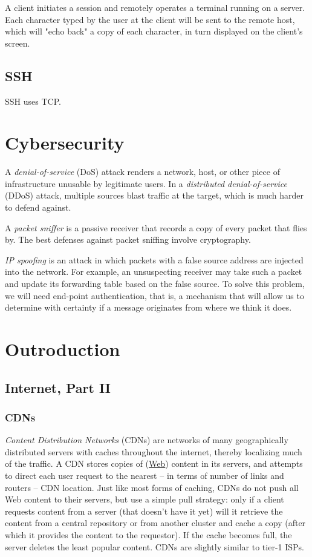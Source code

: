 \documentclass[8pt, table, xcdraw]{article}%
\begin{document}
A client initiates a session and remotely operates a terminal running on a server. Each character typed by the user at the client will be sent to the remote host, which will "echo back" a copy of each character, in turn displayed on the client's screen.

\subsection{SSH} \label{ssh}

SSH uses TCP.

\section{Cybersecurity} \label{ch:cybersecurity}

A \emph{denial-of-service} (DoS) attack renders a network, host, or other piece of infrastructure unusable by legitimate users. In a \emph{distributed denial-of-service} (DDoS) attack, multiple sources blast traffic at the target, which is much harder to defend against.

A \emph{packet sniffer} is a passive receiver that records a copy of every packet that flies by. The best defenses against packet sniffing
involve cryptography.

\emph{IP spoofing} is an attack in which packets with a false source address are injected into the network. For example, an unsuspecting receiver may take such a packet and update its forwarding table based on the false source. To solve this problem, we will need end-point authentication, that is, a mechanism that will allow us to determine with certainty if a message originates from where we think it does.

\section{Outroduction} \label{ch:outro}

\subsection{Internet, Part II}

\subsubsection{CDNs}

\emph{Content Distribution Networks} (CDNs) are networks of many geographically distributed servers with caches throughout the internet, thereby localizing much of the traffic. A CDN stores copies of (\hyperref[HTTP]{Web}) content in its servers, and attempts to direct each user request to the nearest -- in terms of number of links and routers -- CDN location. Just like most forms of caching, CDNs do not push all Web content to their servers, but use a simple pull strategy: only if a client requests content from a server (that doesn't have it yet) will it retrieve the content from a central repository or from another cluster and cache a copy (after which it provides the content to the requestor). If the cache becomes full, the server deletes the least popular content. CDNs are slightly similar to tier-1 ISPs.
\end{document}
